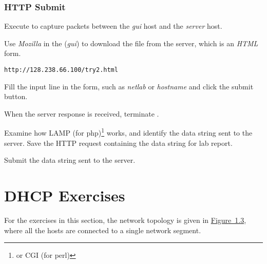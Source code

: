 \documentclass{../UTNetLab}
\begin{document}
\section{HTTP Submit}
Execute  to capture packets between the \textit{gui} host and the \textit{server} host.

Use \textit{Mozilla}  in the (\textit{gui}) to download the  file  from the server, which is an \textit{HTML} form.

\begin{lstlisting}
http://128.238.66.100/try2.html
\end{lstlisting}

Fill the input line in the form, such as \textit{netlab} or \textit{hostname} and click the submit button.

When the server response is received, terminate .

Examine how LAMP (for php)\footnote{or CGI (for perl)} works, and identify the data string sent to the server.
Save the HTTP request containing the data string for lab report.

\begin{report}
    \item Submit the data string sent to the server.
\end{report}

\part{DHCP Exercises}
For the exercises in this section, the network topology is given in \hyperref[fig:1.3]{Figure~1.3}, where all the hosts are connected to a single network segment.
\end{document}
